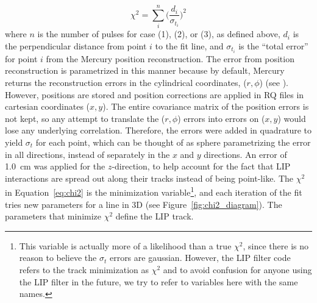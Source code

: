 \begin{equation}
\label{eq:chi2}
\chi^{2} = \sum_{i}^{n} \Big( \frac{d_{i}}{\sigma_{t_{i}}} \Big)^{2}
\end{equation}
where $n$ is the number of pulses for case (1), (2), or (3), as defined above, $d_{i}$ is the perpendicular distance from point $i$ to the fit line, and $\sigma_{t_{i}}$ is the ``total error'' for point $i$ from the Mercury position reconstruction. The error from position reconstruction is parametrized in this manner because by default, Mercury returns the reconstruction errors in the cylindrical coordinates, ($r, \phi$) (see \cite{LUXPositionReconstruction}). However, positions are stored and position corrections are applied in \ac{RQ} files in cartesian coordinates ($x, y$). The entire covariance matrix of the position errors is not kept, so any attempt to translate the ($r, \phi$) errors into errors on ($x, y$) would lose any underlying correlation. Therefore, the errors were added in quadrature to yield $\sigma_{t}$ for each point, which can be thought of as sphere parametrizing the error in all directions, instead of separately in the $x$ and $y$ directions. An error of 1.0~cm was applied for the $z$-direction, to help account for the fact that \ac{LIP} interactions are spread out along their tracks instead of being point-like. The $\chi^{2}$ in Equation~\ref{eq:chi2} is the minimization variable\footnote{This variable is actually more of a likelihood than a true $\chi^{2}$, since there is no reason to believe the $\sigma_{t}$ errors are gaussian. However, the \ac{LIP} filter code refers to the track minimization as $\chi^{2}$ and to avoid confusion for anyone using the \ac{LIP} filter in the future, we try to refer to variables here with the same names.}, and each iteration of the fit tries new parameters for a line in 3D (see Figure~\ref{fig:chi2_diagram}). The parameters that minimize $\chi^{2}$ define the \ac{LIP} track. 

